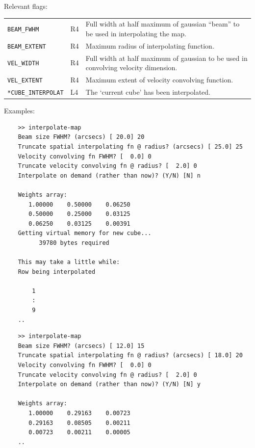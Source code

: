 \documentclass[11pt,twoside]{report}
\begin{document}
Relevant flags:\\
\begin{tabular}{lll}
  \verb+BEAM_FWHM+   & R4 & \parbox[t]{4in}
                            {Full width at half maximum of gaussian ``beam''
                            to be used in interpolating the map.}\\
  \verb+BEAM_EXTENT+ & R4 & Maximum radius of interpolating function.\\
  \verb+VEL_WIDTH+   & R4 &  \parbox[t]{4in}
                            {Full width at half maximum of gaussian
                            to be used in convolving velocity dimension.}\\
  \verb+VEL_EXTENT+  & R4 & Maximum extent of velocity convolving function.\\
  \verb+*CUBE_INTERPOLAT+ & L4 & The `current cube' has been interpolated.\\
\end{tabular}

Examples:
\begin{verbatim}
    >> interpolate-map
    Beam size FWHM? (arcsecs) [ 20.0] 20
    Truncate spatial interpolating fn @ radius? (arcsecs) [ 25.0] 25
    Velocity convolving fn FWHM? [  0.0] 0
    Truncate velocity convolving fn @ radius? [  2.0] 0
    Interpolate on demand (rather than now)? (Y/N) [N] n

    Weights array:
       1.00000    0.50000    0.06250
       0.50000    0.25000    0.03125
       0.06250    0.03125    0.00391
    Getting virtual memory for new cube...
          39780 bytes required

    This may take a little while:
    Row being interpolated

        1
        :
        9
    ..
\end{verbatim}

\begin{verbatim}
    >> interpolate-map
    Beam size FWHM? (arcsecs) [ 12.0] 15
    Truncate spatial interpolating fn @ radius? (arcsecs) [ 18.0] 20
    Velocity convolving fn FWHM? [  0.0] 0
    Truncate velocity convolving fn @ radius? [  2.0] 0
    Interpolate on demand (rather than now)? (Y/N) [N] y

    Weights array:
       1.00000    0.29163    0.00723
       0.29163    0.08505    0.00211
       0.00723    0.00211    0.00005
    ..
\end{verbatim}
\end{document}
